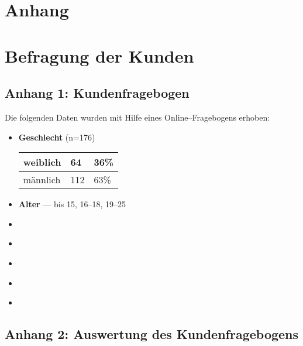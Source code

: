 
\appendix
\section*{Anhang}

\section*{Befragung der Kunden}
\label{sec:kundenbefragung}
\subsection*{Anhang 1: Kundenfragebogen}

Die folgenden Daten wurden mit Hilfe eines Online–Fragebogens erhoben:

\begin{itemize}
\item \textbf{Geschlecht} (n=176) \\ 
\begin{tabular}{ | l | l | l | } \hline                       
  weiblich &  64 & 36\%  \\ \hline
  männlich & 112 & 63\%  \\ \hline 
\end{tabular}
\item \textbf{Alter} --- bis 15, 16--18, 19--25
\item \textbf{}
\item \textbf{}
\item \textbf{}
\item \textbf{}
\item \textbf{}

\end{itemize}

\subsection*{Anhang 2: Auswertung des Kundenfragebogens}
